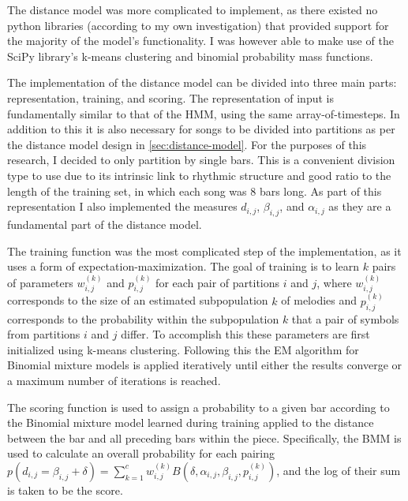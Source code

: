 \documentclass[ author={Stephen Livermore-Tozer},
				supervisor={Dr. Peter Flach},
				degree={MEng},
				title={Algorithmic Co-composition Using Machine Learning},
				subtitle={},
				type={research},
				year={2016} ]{dissertation}
\begin{document}
	The distance model was more complicated to implement, as there existed no python libraries (according to my own investigation) that provided support for the majority of the model's functionality. I was however able to make use of the SciPy library's k-means clustering and binomial probability mass functions. 
	
	The implementation of the distance model can be divided into three main parts: representation, training, and scoring. The representation of input is fundamentally similar to that of the HMM, using the same array-of-timesteps. In addition to this it is also necessary for songs to be divided into partitions as per the distance model design in \ref{sec:distance-model}. For the purposes of this research, I decided to only partition by single bars. This is a convenient division type to use due to its intrinsic link to rhythmic structure and good ratio to the length of the training set, in which each song was 8 bars long. As part of this representation I also implemented the measures $d_{i,j}$, $\beta_{i,j}$, and $\alpha_{i,j}$ as they are a fundamental part of the distance model.
	
	The training function was the most complicated step of the implementation, as it uses a form of expectation-maximization. The goal of training is to learn $k$ pairs of parameters $w^{(k)}_{i,j}$ and $p^{(k)}_{i,j}$ for each pair of partitions $i$ and $j$, where $w^{(k)}_{i,j}$ corresponds to the size of an estimated subpopulation $k$ of melodies and $p^{(k)}_{i,j}$ corresponds to the probability within the subpopulation $k$ that a pair of symbols from partitions $i$ and $j$ differ. To accomplish this these parameters are first initialized using k-means clustering. Following this the EM algorithm for Binomial mixture models \cite{bilmes1998gentle} is applied iteratively until either the results converge or a maximum number of iterations is reached. 
	
	The scoring function is used to assign a probability to a given bar according to the Binomial mixture model learned during training applied to the distance between the bar and all preceding bars within the piece. Specifically, the BMM is used to calculate an overall probability for each pairing $p(d_{i,j} = \beta_{i,j} + \delta) = \sum_{k=1}^{c} w_{i,j}^{(k)} B(\delta,\alpha_{i,j},\beta_{i,j},p_{i,j}^{(k)})$, and the log of their sum is taken to be the score.
	
\end{document}
